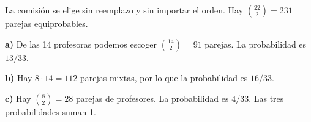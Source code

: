 La comisión se elige sin reemplazo y sin importar el orden.
Hay $\binom{22}{2}=231$ parejas equiprobables.

\textbf{a)} De las 14 profesoras podemos escoger
$\binom{14}{2}=91$ parejas. La probabilidad es $\boxed{13/33}$.

\textbf{b)} Hay $8\cdot14=112$ parejas mixtas, por lo que
la probabilidad es $\boxed{16/33}$.

\textbf{c)} Hay $\binom{8}{2}=28$ parejas de profesores.
La probabilidad es $\boxed{4/33}$. Las tres probabilidades suman 1.
